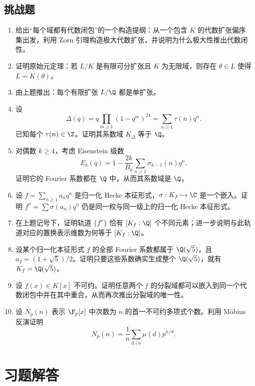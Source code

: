 \subsection*{挑战题}

\begin{enumerate}[label=\arabic*., leftmargin=2.5em, resume]
\item \textbf{\hard} 给出“每个域都有代数闭包”的一个构造提纲：从一个包含 $K$ 的代数扩张偏序集出发，利用 Zorn 引理构造极大代数扩张，并说明为什么极大性推出代数闭性。
\item \textbf{\hard} 证明原始元定理：若 $L/K$ 是有限可分扩张且 $K$ 为无限域，则存在 $\theta\in L$ 使得 $L=K(\theta)$。
\item \textbf{\hard} 由上题推出：每个有限扩张 $L/\Q$ 都是单扩张。
\item \textbf{\hard} 设
\[
\Delta(q)=q\prod_{m\ge1}(1-q^m)^{24}=\sum_{n\ge1}\tau(n)q^n.
\]
已知每个 $\tau(n)\in\Z$。证明其系数域 $K_\Delta$ 等于 $\Q$。
\item \textbf{\hard} 对偶数 $k\ge4$，考虑 Eisenstein 级数
\[
E_k(q)=1-\frac{2k}{B_k}\sum_{n\ge1}\sigma_{k-1}(n)q^n.
\]
证明它的 Fourier 系数都在 $\Q$ 中，从而其系数域是 $\Q$。
\item \textbf{\hard} 设 $f=\sum_{n\ge1}a_n q^n$ 是归一化 Hecke 本征形式，$\sigma:K_f\hookrightarrow\C$ 是一个嵌入。证明 $f^\sigma=\sum \sigma(a_n)q^n$ 仍是同一权与同一级上的归一化 Hecke 本征形式。
\item \textbf{\hard} 在上题记号下，证明轨道 $\{f^\sigma\}$ 恰有 $[K_f:\Q]$ 个不同元素；进一步说明与此轨道对应的置换表示维数为何等于 $[K_f:\Q]$。
\item \textbf{\hard} 设某个归一化本征形式 $f$ 的全部 Fourier 系数都属于 $\Q(\sqrt5)$，且 $a_2=(1+\sqrt5)/2$。证明只要这些系数确实生成整个 $\Q(\sqrt5)$，就有 $K_f=\Q(\sqrt5)$。
\item \textbf{\hard} 设 $f(x)\in K[x]$ 不可约。证明任意两个 $f$ 的分裂域都可以嵌入到同一个代数闭包中并在其中重合，从而再次推出分裂域的唯一性。
\item \textbf{\hard} 设 $N_p(n)$ 表示 $\F_p[x]$ 中次数为 $n$ 的首一不可约多项式个数。利用 Möbius 反演证明
\[
N_p(n)=\frac1n\sum_{d\mid n}\mu(d)p^{n/d}.
\]
\end{enumerate}

\section*{习题解答}

